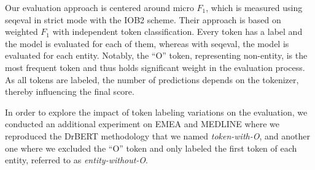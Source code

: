 \begin{reviewread}
Our evaluation approach is centered around micro $F_1$, which is measured using seqeval in strict mode with the IOB2 scheme. Their approach is based on weighted $F_1$ with independent token classification. Every token has a label and the model is evaluated for each of them, whereas with seqeval, the model is evaluated for each entity. Notably, the ``O'' token, representing non-entity, is the most frequent token and thus holds significant weight in the evaluation process. As all tokens are labeled, the number of predictions depends on the tokenizer, thereby influencing the final score.
\end{reviewread}

\begin{reviewread}
In order to explore the impact of token labeling variations on the evaluation, we conducted an additional experiment on EMEA and MEDLINE where we reproduced the DrBERT methodology that we named \textit{token-with-O}, and another one where we excluded the ``O'' token and only labeled the first token of each entity, referred to as \textit{entity-without-O}.
\end{reviewread}

